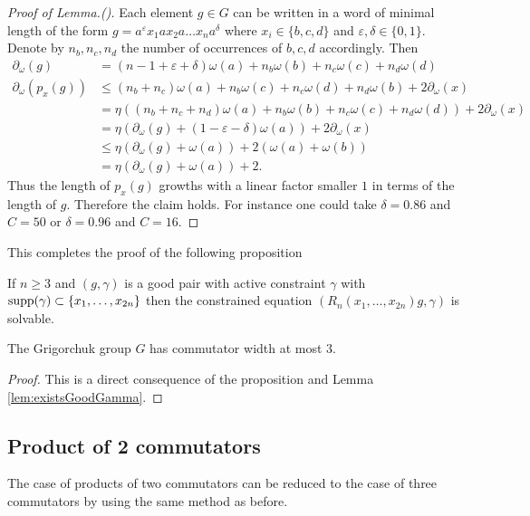 \documentclass[a4paper,11pt]{amsart}
\begin{document}
\begin{proof}[Proof of Lemma.(\cite{Bartholdi:Growth})] 
 Each element $g\in G$ can be written in a word of minimal length of the form $g=a^\varepsilon x_1 a x_2 a\ldots x_n a^\delta$ where
 $x_i\in \{b,c,d\}$ and $\varepsilon,\delta\in \{0,1\}$. Denote by $n_b,n_c,n_d$ the number of occurrences of $b,c,d$ accordingly. 
 Then
 \begin{align*}
  \partial_\omega(g) &= (n-1+\varepsilon+\delta)\omega(a)+n_b\omega(b)+n_c\omega(c)+n_d\omega(d)\\
  \partial_\omega(p_x(g)) &\leq (n_b+n_c)\omega(a)+n_b\omega(c)+n_c\omega(d)+n_d\omega(b) + 2\partial_\omega(x)\\
  &= \eta\left( (n_b+n_c+n_d)\omega(a)+n_b\omega(b)+n_c\omega(c)+n_d\omega(d) \right) + 2\partial_\omega(x)\\
  &= \eta(\partial_\omega(g) +(1-\varepsilon-\delta)\omega(a)) + 2\partial_\omega(x) \\
  &\leq \eta(\partial_\omega(g)+\omega(a)) + 2(\omega(a)+\omega(b))\\
  &= \eta(\partial_\omega(g)+\omega(a)) + 2.
 \end{align*}
 Thus the length of $p_x(g)$ growths with a linear factor smaller $1$ in terms of the length of $g$. Therefore the claim holds.
 For instance one could take $\delta =0.86$ and $C=50$ or $\delta=0.96$ and $C=16$.
\end{proof}
This completes the proof of the following proposition
\begin{pro}\label{pro:solvableConstraintedEquations}
 If $n\geq3$ and $(g,\gamma)$ is a good pair with active constraint $\gamma$ with $\textup{supp}(\gamma)\subset\{x_1,\ldots,x_{2n}\}$
 then the constrained equation $(R_n(x_1,\ldots,x_{2n})g,\gamma)$ is solvable. 
\end{pro}
\begin{cor}
 The Grigorchuk group $G$ has commutator width at most $3$.
\end{cor}
\begin{proof}
 This is a direct consequence of the proposition and Lemma \ref{lem:existsGoodGamma}.
\end{proof}

\subsection{Product of 2 commutators}
The case of products of two commutators can be reduced to the case of three commutators by using the same method as before.
\end{document}
